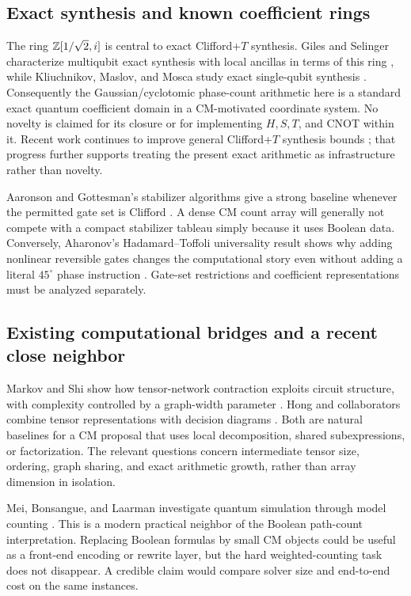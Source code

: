 \subsection{Exact synthesis and known coefficient rings}
The ring $\mathbb Z[1/\sqrt2,i]$ is central to exact Clifford+$T$ synthesis. Giles and Selinger characterize multiqubit exact synthesis with local ancillas in terms of this ring \cite{giles}, while Kliuchnikov, Maslov, and Mosca study exact single-qubit synthesis \cite{kmm}. Consequently the Gaussian/cyclotomic phase-count arithmetic here is a standard exact quantum coefficient domain in a CM-motivated coordinate system. No novelty is claimed for its closure or for implementing $H,S,T$, and CNOT within it.  Recent work continues to improve general Clifford+$T$ synthesis bounds \cite{tan2026}; that progress further supports treating the present exact arithmetic as infrastructure rather than novelty.

Aaronson and Gottesman's stabilizer algorithms give a strong baseline whenever the permitted gate set is Clifford \cite{aaronson}. A dense CM count array will generally not compete with a compact stabilizer tableau simply because it uses Boolean data. Conversely, Aharonov's Hadamard--Toffoli universality result shows why adding nonlinear reversible gates changes the computational story even without adding a literal $45^\circ$ phase instruction \cite{aharonov}. Gate-set restrictions and coefficient representations must be analyzed separately.

\subsection{Existing computational bridges and a recent close neighbor}
Markov and Shi show how tensor-network contraction exploits circuit structure, with complexity controlled by a graph-width parameter \cite{markov}. Hong and collaborators combine tensor representations with decision diagrams \cite{tdd}. Both are natural baselines for a CM proposal that uses local decomposition, shared subexpressions, or factorization. The relevant questions concern intermediate tensor size, ordering, graph sharing, and exact arithmetic growth, rather than array dimension in isolation.

Mei, Bonsangue, and Laarman investigate quantum simulation through model counting \cite{mei}. This is a modern practical neighbor of the Boolean path-count interpretation. Replacing Boolean formulas by small CM objects could be useful as a front-end encoding or rewrite layer, but the hard weighted-counting task does not disappear. A credible claim would compare solver size and end-to-end cost on the same instances.

